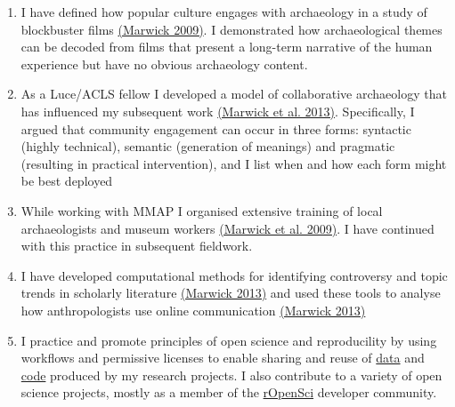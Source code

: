 \documentclass[11pt,article,oneside]{memoir}
\begin{document}
\begin{enumerate}

\item I have defined how popular culture engages with archaeology in a study of blockbuster films  \href{http://faculty.washington.edu/bmarwick/PDFs/Marwick_2010_WA_Wall-E.pdf}{(Marwick 2009)}. I demonstrated how archaeological themes can be decoded from films that present a long-term narrative of the human experience but have no obvious archaeology content.

\item As a Luce/ACLS fellow I developed a model of collaborative archaeology that has influenced my subsequent work {\href{http://faculty.washington.edu/bmarwick/PDFs/Marwick_et_al_2013_community.pdf}{(Marwick et al. 2013)}}. Specifically, I argued that community engagement can occur in three forms: syntactic (highly technical), semantic (generation of meanings) and pragmatic (resulting in practical intervention), and I list when and how each form might be best deployed

\item While working with MMAP I organised extensive training of local archaeologists and museum workers {\href{http://faculty.washington.edu/bmarwick/PDFs/Marwick_et_al_2009_MMAP.pdf}{(Marwick et al. 2009)}}. I have continued with this practice in subsequent fieldwork. 

\item I have developed computational methods for identifying controversy and topic trends in scholarly literature \href{https://github.com/benmarwick/JSTORr}{(Marwick 2013)} and used these tools to analyse how anthropologists use online communication \href{http://faculty.washington.edu/bmarwick/PDFs/Marwick_2013_DMAR.pdf}{(Marwick 2013)}

\item I practice and promote principles of open science and reproducility by using workflows and permissive licenses to enable sharing and reuse of \href{http://figshare.com/authors/Ben\%20Marwick/437155}{data} and \href{https://github.com/benmarwick}{code} produced by my research projects. I also contribute to a variety of open science projects, mostly as a member of the \href{http://ropensci.org/}{rOpenSci} developer community.  

\end{enumerate}

\bigskip     

\end{document}
